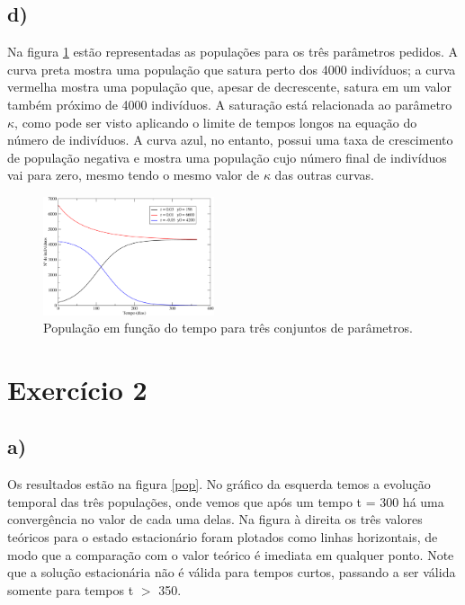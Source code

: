 \documentclass[a4wide]{report}
\begin{document}
\subsection*{ d) }
Na figura \ref{popfinal} estão representadas as populações para os três parâmetros pedidos. A curva preta mostra uma população que satura perto dos 4000 indivíduos;  a curva vermelha mostra uma população que, apesar de decrescente, satura em um valor também próximo de 4000 indivíduos. A saturação está relacionada ao parâmetro $\kappa$, como pode ser visto aplicando o limite de tempos longos na equação do número de indivíduos.  A curva azul, no entanto, possui uma taxa de crescimento de população negativa e mostra uma população cujo número final de indivíduos vai para zero, mesmo tendo o mesmo valor de $\kappa$ das outras curvas.
\begin{figure}
\centering
\includegraphics[width=0.447\textwidth]{1final.pdf}
\caption{População em função do tempo para três conjuntos de parâmetros.}
\label{popfinal}
\end{figure}


\section*{Exercício 2}

\subsection*{a)}
Os resultados estão na figura \ref{pop}. No gráfico da esquerda temos a evolução temporal das três populações, onde vemos que após um tempo t = 300 há uma convergência no valor de cada uma delas. Na figura à direita os três valores teóricos para o estado estacionário foram plotados como linhas horizontais, de modo que a comparação com o valor teórico é imediata em qualquer ponto. Note que a solução estacionária não é válida para tempos curtos, passando a ser válida somente para tempos t $>$ 350.
\end{document}
